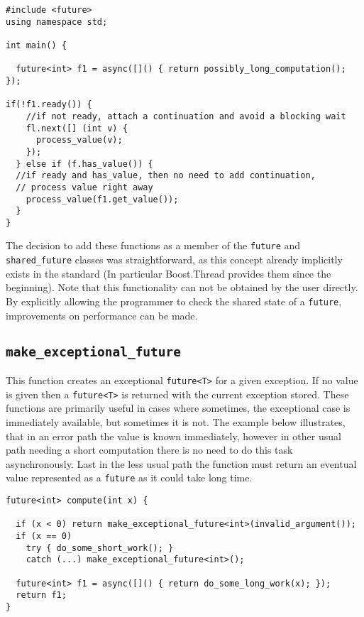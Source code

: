 \documentclass[a4paper,10pt]{article}
\newcommand{\cpp}[1]{\lstinline{#1}}
\begin{document}
\begin{lstlisting}[xleftmargin=0pt]
#include <future> 
using namespace std; 

int main() { 
 
  future<int> f1 = async([]() { return possibly_long_computation(); }); 
 
if(!f1.ready()) { 
    //if not ready, attach a continuation and avoid a blocking wait 
    fl.next([] (int v) { 
      process_value(v); 
    }); 
  } else if (f.has_value()) { 
  //if ready and has_value, then no need to add continuation, 
  // process value right away 
    process_value(f1.get_value()); 
  }
} 
\end{lstlisting}

The decision to add these functions as a member of the \cpp{future} and \cpp{shared_future} classes was straightforward, as this concept already implicitly exists in the standard (In particular Boost.Thread provides them since the beginning). Note that this functionality can not be obtained by the user directly. By explicitly allowing the programmer to check the shared state of a \cpp{future}, improvements on performance can be made.  

\subsection{\cpp{make_exceptional_future}}


This function creates an exceptional \cpp{future<T>} for a given exception. If no value is given then a \cpp{future<T>} is returned with the current exception stored. These functions are primarily useful in cases where sometimes, the exceptional case is immediately available, but sometimes it is not. The example below illustrates, that in an error path the value is known immediately, however in other usual path needing a short computation there is no need to do this task asynchronously. Last in the  less usual path the function must return an eventual value represented as a \cpp{future} as it could take long time. 

\begin{lstlisting}[xleftmargin=0pt]
future<int> compute(int x) { 
 
  if (x < 0) return make_exceptional_future<int>(invalid_argument()); 
  if (x == 0) 
    try { do_some_short_work(); } 
    catch (...) make_exceptional_future<int>(); 
 
  future<int> f1 = async([]() { return do_some_long_work(x); }); 
  return f1; 
}
\end{lstlisting}
\end{document}
